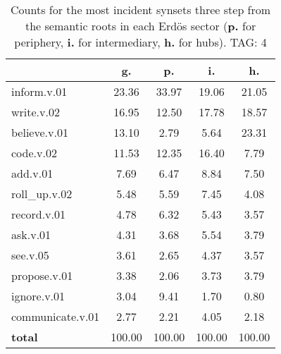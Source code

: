 \begin{table}[h!]
\begin{center}
\begin{tabular}{| l || c | c | c | c |}\hline
 & {\bf g.} & {\bf p.} & {\bf i.} & {\bf h.} \\\hline\hline
inform.v.01 & 23.36  & 33.97  & 19.06  & 21.05 \\\hline
write.v.02 & 16.95  & 12.50  & 17.78  & 18.57 \\\hline
believe.v.01 & 13.10  & 2.79  & 5.64  & 23.31 \\\hline
code.v.02 & 11.53  & 12.35  & 16.40  & 7.79 \\\hline
add.v.01 & 7.69  & 6.47  & 8.84  & 7.50 \\\hline
roll\_up.v.02 & 5.48  & 5.59  & 7.45  & 4.08 \\\hline
record.v.01 & 4.78  & 6.32  & 5.43  & 3.57 \\\hline
ask.v.01 & 4.31  & 3.68  & 5.54  & 3.79 \\\hline
see.v.05 & 3.61  & 2.65  & 4.37  & 3.57 \\\hline
propose.v.01 & 3.38  & 2.06  & 3.73  & 3.79 \\\hline
ignore.v.01 & 3.04  & 9.41  & 1.70  & 0.80 \\\hline
communicate.v.01 & 2.77  & 2.21  & 4.05  & 2.18 \\\hline\hline
{{\bf total}} & 100.00  & 100.00  & 100.00  & 100.00 \\\hline
\end{tabular}
\caption{Counts for the most incident synsets three step from the semantic roots in each Erd\"os sector ({\bf p.} for periphery, {\bf i.} for intermediary, {\bf h.} for hubs). TAG: 4}
\end{center}
\end{table}